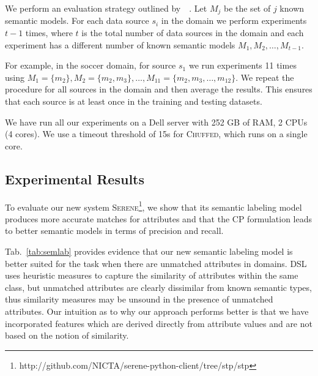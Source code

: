 \documentclass[letterpaper]{article} %
\newcommand{\authornote}[3]{
  {\fbox{\sc 
  #1}:$\blacktriangleright$\textcolor{#2}{\small{#3}}$\blacktriangleleft$}%
}
\newcommand{\npr}[1]{\authornote{NPR}{orange}{#1}}
\newcommand{\chuffed}{\textsc{Chuffed}}
\newcommand{\serene}{\textsc{Serene}}
\newcommand{\ignore}[1]{}
\newcommand{\forijcai}[1]{}
\newcommand{\citeasnoun}[1]{\citeauthor{#1}~\shortcite{#1}}
\begin{document}
We perform an evaluation strategy outlined by~\citeasnoun{taheriyan2016learning}.
Let $M_j$ be the set of $j$ known semantic models.
For each data source $s_i$ in the domain we perform experiments $t-1$ times,
where $t$ is the total number of data sources in the domain and each experiment has a different number of known semantic models $M_1, M_2, \ldots, M_{t-1}$.
\forijcai{The case with $M_{t-1}$ known semantic models corresponds to leave-one-out validation strategy.} 
For example, in the soccer domain, for source $s_1$ we run experiments 11 times using $M_1=\{m_2\}, M_2=\{m_2, m_3\}, \ldots, M_{11}=\{m_2, m_3, \ldots, m_{12}\}$.
We repeat the procedure for all sources in the domain and then average the results.
This \forijcai{procedure} ensures that each source is at least once in the training and testing datasets.


We have run all our experiments on a Dell server with 252 GB of RAM, 2 CPUs (4 cores).
We use a timeout threshold of 15s for \chuffed{}, which 
runs on a single core.

\subsection{Experimental Results}

To evaluate our new system \serene{}\footnote{ http://github.com/NICTA/serene-python-client/tree/stp/stp}, we show that its semantic labeling model 
produces more accurate matches for attributes and that the CP formulation leads 
to better semantic models in terms of precision and recall.

\ignore{We have developed a new approach for semantic labeling which can 
efficiently handle the \emph{unknown} class.}
\ignore{We demonstrate its efficiency by comparing against the state-of-the-art 
approach DSL~\cite{Pham:semantic}. } %
Tab.~\ref{tab:semlab} provides evidence that our new semantic labeling model is better suited for the task when there are unmatched attributes in domains.
DSL uses heuristic measures to capture the similarity of attributes within the same class, but 
unmatched attributes are clearly dissimilar from known semantic types, thus similarity measures may be unsound in the presence of unmatched attributes.
Our intuition as to why our approach performs better is that we have 
incorporated features which are derived directly from attribute values and are 
not based on the notion of similarity.
\end{document}
